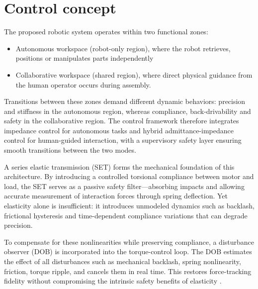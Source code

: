 \documentclass[11pt,a4paper]{article}
\begin{document}
\section*{Control concept}

The proposed robotic system operates within two functional zones:


\begin{itemize}
    \item Autonomous workspace (robot-only region), where the robot retrieves, positions or manipulates parts independently
    \item Collaborative workspace (shared region), where direct physical guidance from the human operator occurs during assembly.
\end{itemize}

Transitions between these zones demand different dynamic behaviors: precision and stiffness in the autonomous region, whereas compliance, back-drivability and safety in the collaborative region. The control framework therefore integrates impedance control for autonomous tasks and hybrid admittance-impedance control for human-guided interaction, with a supervisory safety layer ensuring smooth transitions between the two modes.

A series elastic transmission (SET) forms the mechanical foundation of this architecture. By introducing a controlled torsional compliance between motor and load, the SET serves as a passive safety filter—absorbing impacts and allowing accurate measurement of interaction forces through spring deflection. Yet elasticity alone is insufficient: it introduces unmodeled dynamics such as backlash, frictional hysteresis and time-dependent compliance variations that can degrade precision.

To compensate for these nonlinearities while preserving compliance, a disturbance observer (DOB) is incorporated into the torque-control loop. The DOB estimates the effect of all disturbances such as mechanical backlash, spring nonlinearity, friction, torque ripple, and cancels them in real time. This restores force-tracking fidelity without compromising the intrinsic safety benefits of elasticity \cite{Paine2016_SEA}\cite{Shim2021_DO}.
\newpage
\end{document}
